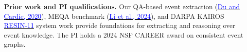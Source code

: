 \documentclass[11pt,letterpaper]{article}
\newcommand{\head}[1]{\textbf{#1}\enspace}
\begin{document}
\par\head{Prior work and PI qualifications.} Our QA-based event extraction (\href{https://doi.org/10.18653/v1/2020.emnlp-main.49}{\textcolor{blue}{Du and Cardie, 2020}}), MEQA benchmark (\href{https://openreview.net/forum?id=snNuvAOQxB}{\textcolor{blue}{Li et al., 2024}}), and DARPA KAIROS \href{https://doi.org/10.18653/v1/2022.naacl-demo.7}{\textcolor{blue}{RESIN-11}} system work provide foundations for extracting and reasoning over event knowledge. The PI holds a 2024 NSF CAREER award on consistent event graphs.
\end{document}
